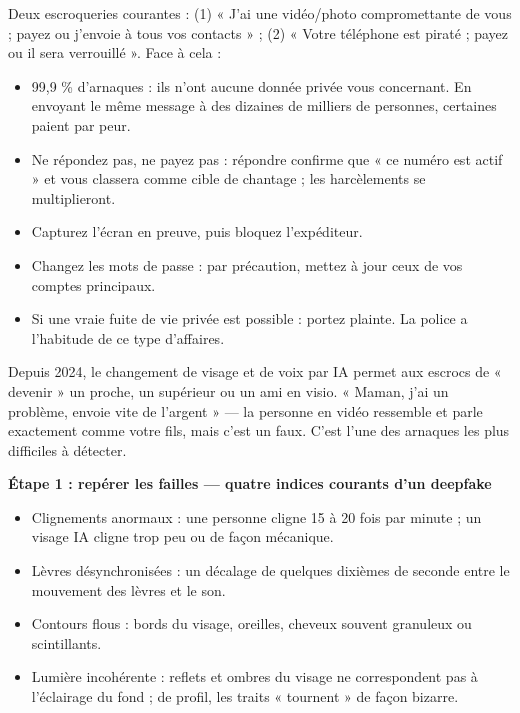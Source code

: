 
Deux escroqueries courantes : (1) « J'ai une vidéo/photo compromettante de vous ; payez ou j'envoie à tous vos contacts » ; (2) « Votre téléphone est piraté ; payez ou il sera verrouillé ». Face à cela :

\begin{itemize}
  \item 99,9 \% d'arnaques : ils n'ont aucune donnée privée vous concernant. En envoyant le même message à des dizaines de milliers de personnes, certaines paient par peur.
  \item Ne répondez pas, ne payez pas : répondre confirme que « ce numéro est actif » et vous classera comme cible de chantage ; les harcèlements se multiplieront.
  \item Capturez l'écran en preuve, puis bloquez l'expéditeur.
  \item Changez les mots de passe : par précaution, mettez à jour ceux de vos comptes principaux.
  \item Si une vraie fuite de vie privée est possible : portez plainte. La police a l'habitude de ce type d'affaires.
\end{itemize}


Depuis 2024, le changement de visage et de voix par IA permet aux escrocs de « devenir » un proche, un supérieur ou un ami en visio. « Maman, j'ai un problème, envoie vite de l'argent » — la personne en vidéo ressemble et parle exactement comme votre fils, mais c'est un faux. C'est l'une des arnaques les plus difficiles à détecter.

\textbf{Étape 1 : repérer les failles — quatre indices courants d'un deepfake}\par

\begin{itemize}
  \item Clignements anormaux : une personne cligne 15 à 20 fois par minute ; un visage IA cligne trop peu ou de façon mécanique.
  \item Lèvres désynchronisées : un décalage de quelques dixièmes de seconde entre le mouvement des lèvres et le son.
  \item Contours flous : bords du visage, oreilles, cheveux souvent granuleux ou scintillants.
  \item Lumière incohérente : reflets et ombres du visage ne correspondent pas à l'éclairage du fond ; de profil, les traits « tournent » de façon bizarre.
\end{itemize}


